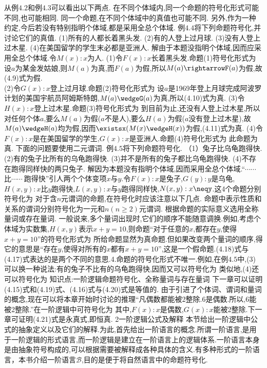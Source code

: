 {从例$4.2$和例$4.3$可以看出以下两点.
在不同个体域内,同一个命题的符号化形式可能不同,也可能相同.
同一个命题,在不同个体域中的真值也可能不同.
另外,作为一种约定,今后若没有特别指明个体域,都是采用全总个体域.
例$4.4$将下列命题符号化,并讨论它们的真值.
(1)所有的人都长着黑头发.
(2)有的人登上过月球.
(3)没有人登上过木星.
(4)在美国留学的学生末必都是亚洲人.
解由于本题没指明个体域,因而应采用全总个体域.令$M(x):x$为人.
(1)令$F(x):x$长着黑头发.命题(1)符号化形式为
设$a$为某金发姑娘,则$M(a)$为真,而$F(a)$为假,所以$M(a)\rightarrowF(a)$为假,故(4.9)式为假.\\
(2)令$G(x):x$登上过月球.命题(2)符号化形式为
设$a$是1969年登上月球完成阿波罗计划的美国宇航员阿姆斯特朗,$M(a)\wedgeG(a)$为真,所以(4.10)式为真.
(3)令$H(x):x$登上过木星.命题(3)符号化形式为
到目前为止,还没有人登上过木星,所以对任何个体$a$,要么$M(a)$为假($a$不是人),要么$H(a)$为假($a$没有登上过木星),故$M(a)\wedgeH(a)$均为假,因而$\existsx(M(x)\wedgeH(x))$为假,(4.11)式为真.
(4)令$F(x):x$是在美国留学的学生,$G(x):x$是亚洲人.命题(4)符号化形式为
此命题为真.
下面的问题要使用二元谓词.
例$4.5$将下列命题符号化.
（1）兔子比乌龟跑得快.
(2)有的兔子比所有的乌龟跑得快.
(3)并不是所有的兔子都比乌龟跑得快.
(4)不存在跑得同样快的两只兔子.
解因为本题没有指明个体域,因而采用全总个体域.“$\cdots\cdots$比$\cdots\cdots\mathrm{~跑得快”}$引人两个个体变项$x$与$y$.令$F(x):x$是兔子,$G(y):y$是乌龟,$H(x,y):x$比$y$跑得快,$L(x,y):x$与$y$跑得同样快,$N(x,y):x\neqy$.这4个命题分别符号化为
对于含$n$元谓词的命题,在符号化时应该注意以下几点.
命题中表示性质和关系的谓词分别符号化为一元和$n(n\geqslant2)$元谓词.
根据命题的实际意义选用全称量词或存在量词.
一般说来,多个量词出现时,它们的顺序不能随意调换.例如,考虑个体域为实数集,$H(x,y)$表示$x+y=10$,则命题“对于任意的$x$,都存在$y$,使得$x+y=10$”的符号化形式为
所给命题显然为真命题.但如果改变两个量词的顺序,得
它的意思是“存在$y$,使得对所有的$x$都有$x+y=10$”,这是一个假命题.(4.18)式与(4.17)式表达的是两个不同的意思.4.命题的符号化形式不唯一.例如,在例$4.5$中,(3)可以换一种说法:有的兔子不比有的乌龟跑得快,因而又可以符号化为
类似地,(4)还可以符号化为
知识点:一阶逻辑命题符号化、全称量词与存在量词
下一章可以证明(4.15)式和(4.19)式、(4.16)式与(4.20)式是等值的.
由于引进了个体词、谓词和量词的概念,现在可以将本章开始时讨论的推理“凡偶数都能被2整除.6是偶数.所以,6能被2整除.”在一阶逻辑中可符号化为
其中,$F(x):x$是偶数,$G(x):x$能被2整除.下一章可证明(4.21)式是永真式,即恒真.
{2一阶逻辑公式及解释}
本节给出一阶逻辑中公式的抽象定义以及它们的解释.为此,首先给出一阶语言的概念.所谓一阶语言,是用于一阶逻辑的形式语言,而一阶逻辑是建立在一阶语言上的逻辑体系.一阶语言本身是由抽象符号构成的,可以根据需要被解释成各种具体的含义.有多种形式的一阶语言，本书介绍一阶语言$\mathscr{B}$,目的是便于将自然语言中的命题符号化.
}
